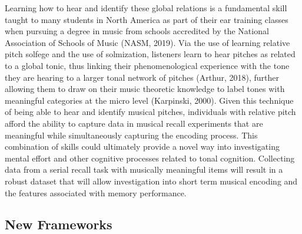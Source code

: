 \documentclass[english,man,floatsintext]{apa6}
\begin{document}
Learning how to hear and identify these global relations is a fundamental skill taught to many students in North America as part of their ear training classes when pursuing a degree in music from schools accredited by the National Association of Schools of Music (NASM, 2019).
Via the use of learning relative pitch solfege and the use of solmization, listeners learn to hear pitches as related to a global tonic, thus linking their phenomenological experience with the tone they are hearing to a larger tonal network of pitches (Arthur, 2018), further allowing them to draw on their music theoretic knowledge to label tones with meaningful categories at the micro level (Karpinski, 2000).
Given this technique of being able to hear and identify musical pitches, individuals with relative pitch afford the ability to capture data in musical recall experiments that are meaningful while simultaneously capturing the encoding process.
This combination of skills could ultimately provide a novel way into investigating mental effort and other cognitive processes related to tonal cognition.
Collecting data from a serial recall task with musically meaningful items will result in a robust dataset that will allow investigation into short term musical encoding and the features associated with memory performance.

\hypertarget{new-frameworks}{%
\subsection{New Frameworks}\label{new-frameworks}}
\end{document}
